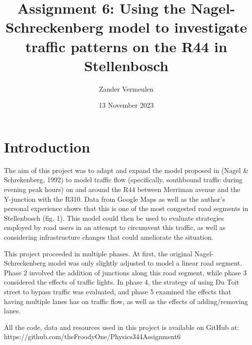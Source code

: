 \documentclass{article}
\title{Assignment 6: Using the Nagel-Schreckenberg model to investigate traffic patterns on the R44 in Stellenbosch}
\author{Zander Vermeulen}
\date{13 November 2023}
\begin{document}
\maketitle

\section*{Introduction}

The aim of this project was to adapt and expand the model proposed in (Nagel \& Schrekenberg, 1992) to model traffic flow (specifically, southbound traffic during evening peak hours) on and around the R44 between Merriman avenue and the Y-junction with the R310. Data from Google Maps as well as the author's personal experience shows that this is one of the most congested road segments in Stellenbosch (fig. 1). This model could then be used to evaluate strategies employed by road users in an attempt to circumvent this traffic, as well as considering infrastructure changes that could ameliorate the situation.

This project proceeded in multiple phases. At first, the original Nagel-Schreckenberg model was only slightly adjusted to model a linear road segment. Phase 2 involved the addition of junctions along this road segment, while phase 3 considered the effects of traffic lights. In phase 4, the strategy of using Du Toit street to bypass traffic was evaluated, and phase 5 examined the effects that having multiple lanes has on traffic flow, as well as the effects of adding/removing lanes.

All the code, data and resources used in this project is available on GitHub at: https://github.com/theFroodyOne/Physics344Assignment6
\end{document}

